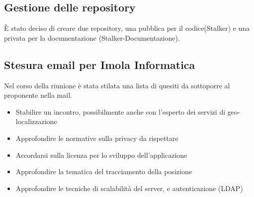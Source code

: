 \subsection{Gestione delle repository}
È stato deciso di creare due repository, una pubblica per il codice(Stalker) e una privata per la documentazione (Stalker-Documentazione). \\

\subsection{Stesura email per Imola Informatica}
Nel corso della riunione è stata stilata una lista di quesiti da sottoporre al proponente nella mail. 
\begin{itemize}
\item Stabilire un incontro, possibilmente anche con l’esperto dei servizi di geo-localizzazione
\item Approfondire le normative sulla privacy da rispettare
\item Accordarsi sulla licenza per lo sviluppo dell'applicazione
\item Approfondire la tematica del tracciamento della posizione
\item Approfondire le tecniche di scalabilità del server, e autenticazione (LDAP)
\end{itemize} 

\clearpage